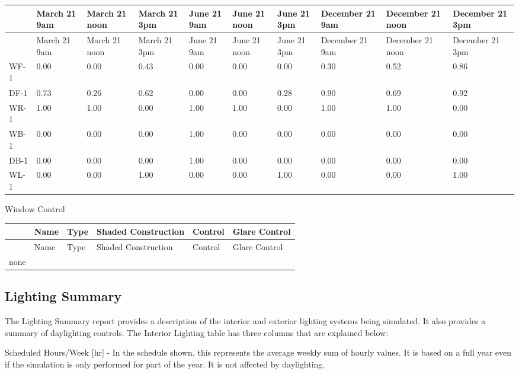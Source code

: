 {\scriptsize
\begin{longtable}[c]{p{0.6in}p{0.6in}p{0.6in}p{0.6in}p{0.6in}p{0.6in}p{0.6in}p{0.6in}p{0.6in}p{0.6in}}
\toprule 
~ & March 21 9am & March 21 noon & March 21 3pm & June 21 9am & June 21 noon & June 21 3pm & December 21 9am & December 21 noon & December 21 3pm \tabularnewline
\midrule
\endfirsthead

\toprule 
~ & March 21 9am & March 21 noon & March 21 3pm & June 21 9am & June 21 noon & June 21 3pm & December 21 9am & December 21 noon & December 21 3pm \tabularnewline
\midrule
\endhead

WF-1 & 0.00 & 0.00 & 0.43 & 0.00 & 0.00 & 0.00 & 0.30 & 0.52 & 0.86 \tabularnewline
DF-1 & 0.73 & 0.26 & 0.62 & 0.00 & 0.00 & 0.28 & 0.90 & 0.69 & 0.92 \tabularnewline
WR-1 & 1.00 & 1.00 & 0.00 & 1.00 & 1.00 & 0.00 & 1.00 & 1.00 & 0.00 \tabularnewline
WB-1 & 0.00 & 0.00 & 0.00 & 1.00 & 0.00 & 0.00 & 0.00 & 0.00 & 0.00 \tabularnewline
DB-1 & 0.00 & 0.00 & 0.00 & 1.00 & 0.00 & 0.00 & 0.00 & 0.00 & 0.00 \tabularnewline
WL-1 & 0.00 & 0.00 & 1.00 & 0.00 & 0.00 & 1.00 & 0.00 & 0.00 & 1.00 \tabularnewline
\bottomrule
\end{longtable}}

Window Control

\begin{longtable}[c]{@{}llllll@{}}
\toprule 
~ & Name & Type & Shaded Construction & Control & Glare Control \tabularnewline
\midrule
\endfirsthead

\toprule 
~ & Name & Type & Shaded Construction & Control & Glare Control \tabularnewline
\midrule
\endhead

none & ~ & ~ & ~ & ~ & ~ \tabularnewline
\bottomrule
\end{longtable}

\subsection{Lighting Summary}\label{lighting-summary}

The Lighting Summary report provides a description of the interior and exterior lighting systems being simulated. It also provides a summary of daylighting controls. The Interior Lighting table has three columns that are explained below:

Scheduled Hours/Week {[}hr{]} - In the schedule shown, this represents the average weekly sum of hourly values. It is based on a full year even if the simulation is only performed for part of the year. It is not affected by daylighting.

